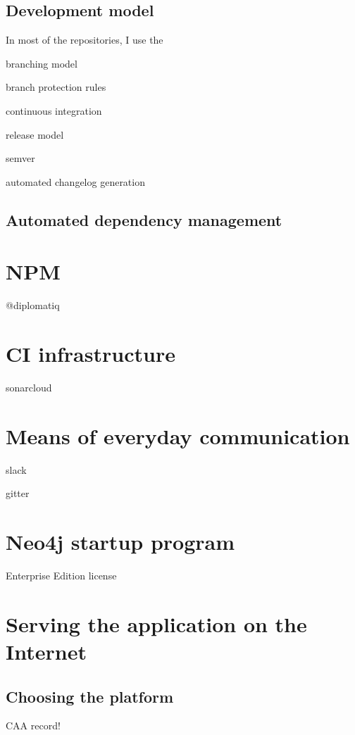 \subsection{Development model}

In most of the repositories, I use the

branching model

branch protection rules

continuous integration

release model

semver

automated changelog generation

\subsection{Automated dependency management}

\section{NPM}

@diplomatiq

\section{CI infrastructure}

sonarcloud

\section{Means of everyday communication}

slack

gitter

\section{Neo4j startup program}
Enterprise Edition license

\section{Serving the application on the Internet}

\subsection{Choosing the platform}

CAA record!

